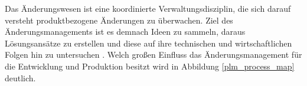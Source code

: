 \documentclass[a4paper,12pt]{report}
\begin{document}
Das Änderungswesen ist eine koordinierte Verwaltungsdisziplin, die sich darauf versteht produktbezogene Änderungen zu überwachen. Ziel des Änderungsmanagements ist es demnach Ideen zu sammeln, daraus Lösungsansätze zu erstellen und diese auf ihre technischen und wirtschaftlichen Folgen hin zu untersuchen \citep[vgl.][S. VII]{Prostep2007}. Welch großen Einfluss das Änderungsmanagement für die Entwicklung und Produktion besitzt wird in Abbildung \ref{plm_process_map} deutlich.
\end{document}

